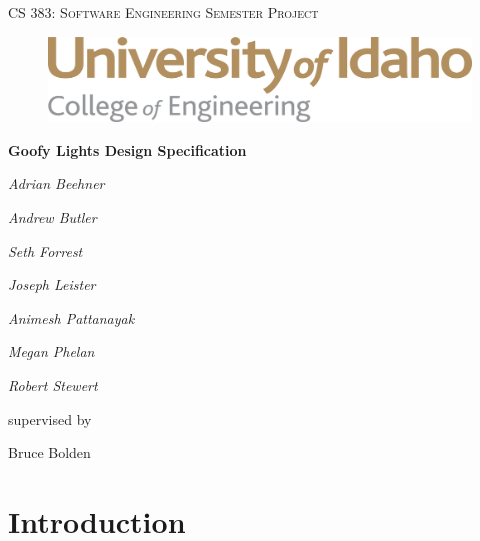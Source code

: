 \documentclass[12pt]{article}
\begin{document}
	\begin{titlepage}
		\centering	
		\vspace{1cm}
  
		{\scshape\Large CS 383: Software Engineering Semester Project\par}
    \begin{figure}[h]
      \centering
      \includegraphics[width=0.7\linewidth]{uislogan}
    \end{figure}   
		\vspace{2.5cm}
    
		{\huge\bfseries Goofy Lights Design Specification\par}
		\vspace{2cm}	
    
		{ 		
  		{\Large\itshape Adrian Beehner\par}
  		{\Large\itshape Andrew Butler\par}
  		{\Large\itshape Seth Forrest\par}
  		{\Large\itshape Joseph Leister\par}
  		{\Large\itshape Animesh Pattanayak\par}
  		{\Large\itshape Megan Phelan\par}
  		{\Large\itshape Robert Stewert\par}		
		}		
    \vspace{1.5cm}	
    
		supervised by\par
		Bruce Bolden		
		\vfill		
	\end{titlepage}

	\tableofcontents
	\newpage
	
	\section{Introduction}
\end{document}
